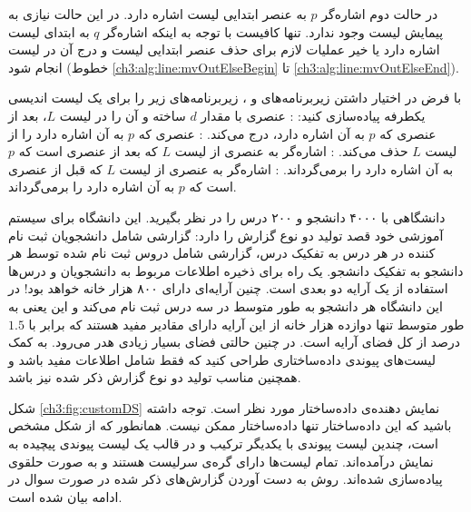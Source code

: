 در حالت دوم اشاره‌گر {$p$} به عنصر ابتدایی لیست {} اشاره دارد. در این حالت نیازی به پیمایش لیست {} وجود ندارد. تنها کافیست با توجه به اینکه اشاره‌گر {$q$} به ابتدای لیست {} اشاره دارد یا خیر عملیات لازم برای حذف عنصر ابتدایی لیست {} و درج آن در لیست {} انجام شود (خطوط {\ref{ch3:alg:line:mvOutElseBegin}} تا {\ref{ch3:alg:line:mvOutElseEnd}}).

 با فرض در اختیار داشتن زیربرنامه‌های {} و {}، زیربرنامه‌های زیر را برای یک لیست اندیسی یکطرفه پیاده‌سازی کنید:
: عنصری با مقدار {$d$} ساخته و آن را در لیست {$L$}، بعد از عنصری که {$p$} به آن اشاره دارد، درج می‌کند.
: عنصری که {$p$} به آن اشاره دارد را از لیست {$L$} حذف می‌کند.
: اشاره‌گر به عنصری از لیست {$L$} که بعد از عنصری است که {$p$} به آن اشاره دارد را برمی‌گرداند.
: اشاره‌گر به عنصری از لیست {$L$} که قبل از عنصری است که {$p$} به آن اشاره دارد را برمی‌گرداند.


 دانشگاهی با ۴۰۰۰ دانشجو و ۲۰۰ درس را در نظر بگیرید. این دانشگاه برای سیستم آموزشی خود قصد تولید دو نوع گزارش را دارد:
 گزارشی شامل دانشجویان ثبت نام کننده در هر درس به تفکیک درس،
 گزارشی شامل دروس ثبت نام شده توسط هر دانشجو به تفکیک دانشجو.
یک راه برای ذخیره اطلاعات مربوط به دانشجویان و درس‌ها استفاده از یک آرایه دو بعدی است. چنین آرایه‌ای دارای ۸۰۰ هزار خانه خواهد بود! در این دانشگاه هر دانشجو به طور متوسط در سه درس ثبت نام می‌کند و این یعنی به طور متوسط تنها دوازده هزار خانه از این آرایه دارای مقادیر مفید هستند که برابر با {$1.5$} درصد از کل فضای آرایه است. در چنین حالتی فضای بسیار زیادی هدر می‌رود. به کمک لیست‌های پیوندی داده‌ساختاری طراحی کنید که فقط شامل اطلاعات مفید باشد و همچنین مناسب تولید دو نوع گزارش ذکر شده نیز باشد.


شکل {\eqref{ch3:fig:customDS}} نمایش دهنده‌ی داده‌ساختار مورد نظر است. توجه داشته باشید که این داده‌ساختار تنها داده‌ساختار ممکن نیست. همانطور که از شکل مشخص است، چندین لیست پیوندی با یکدیگر ترکیب و در قالب یک لیست پیوندی پیچیده به نمایش درآمده‌اند. تمام لیست‌ها دارای گره‌ی سرلیست هستند و به صورت حلقوی پیاده‌سازی شده‌اند. روش به دست آوردن گزارش‌های ذکر شده در صورت سوال در ادامه بیان شده است.

